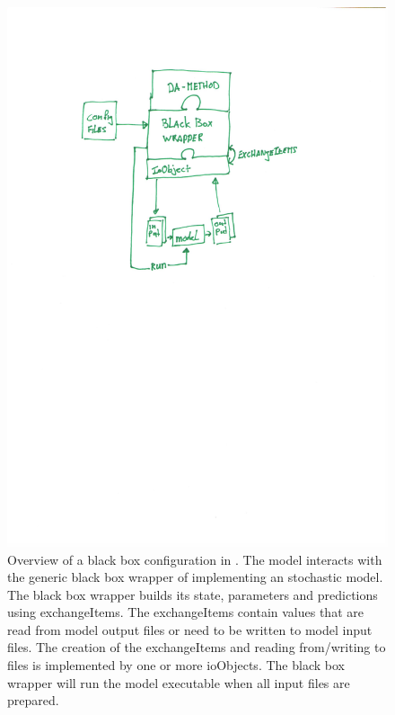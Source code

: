 \begin{figure}[h]
\begin{center}
\includegraphics[scale=0.7]{./blackbox/bb_overview.pdf}
\caption{Overview of a black box configuration in \oda. The model interacts
  with the generic black box wrapper of \oda implementing an \oda stochastic
  model. The black box wrapper builds its state, parameters and predictions
  using exchangeItems. The exchangeItems contain values that are read from
  model output files or need to be written to model input files. The creation
  of the exchangeItems and reading from/writing to files is implemented by one
  or more ioObjects. The black box wrapper will run the model executable when
  all input files are prepared.}
\label{Fig:overview}
\end{center}
\end{figure}


